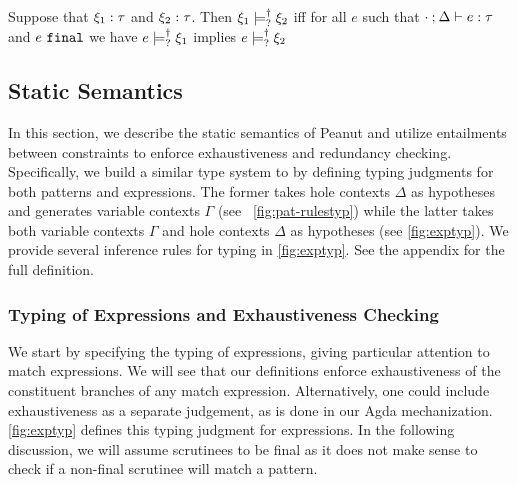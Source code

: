 \begin{definition}
  \label{definition:nn-entailment}
  Suppose that $\xi_1 : \tau$ and $\xi_2 : \tau$. Then $\xi_1 \models_{?}^{\dag} \xi_2$ iff for all $e$ such that $\cdot \mathbin{;} \Delta \vdash e : \tau$ and $e ~\mathtt{final}$ we have $e \models_{?}^{\dag} \xi_1$ implies $e \models_{?}^{\dag} \xi_2$ 
\end{definition}



\subsection{Static Semantics}\label{sec:statics}



In this section, we describe the static semantics of Peanut and utilize entailments between constraints to enforce exhaustiveness and redundancy checking.
  Specifically, we build a similar type system to
\cite{DBLP:journals/pacmpl/OmarVCH19} by defining typing judgments for both
patterns and expressions. The former takes hole contexts $\Delta$ as hypotheses and generates variable contexts $\Gamma$ (see \figurename~\ref{fig:pat-rulestyp}) while the latter 
takes both variable contexts $\Gamma$ and hole contexts $\Delta$ as hypotheses (see
\autoref{fig:exptyp}). We provide several inference rules for typing in \autoref{fig:exptyp}. See the appendix for the full definition.

\subsubsection{Typing of Expressions and Exhaustiveness Checking} \label{sec:exptyp}

We start by specifying the typing of expressions, giving particular attention to match expressions. We will see that our definitions enforce exhaustiveness of the constituent branches of any match expression. Alternatively, one could include exhaustiveness as a separate judgement, as is done in our Agda mechanization. \autoref{fig:exptyp} defines this typing judgment for expressions. 
In the following discussion, we will assume scrutinees to be final as 
it does not make sense to check if a non-final scrutinee will match a pattern.

